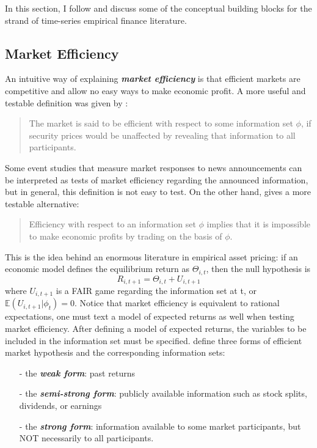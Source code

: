 In this section, I follow \citet[Chapter~5]{campbell2017financial} and discuss some 
of the conceptual building blocks for the strand of time-series empirical finance literature.

\subsection{Market Efficiency}\label{chap1:sec1:ssec1}
An intuitive way of explaining \textbf{\textit{market efficiency}} is that efficient markets
are competitive and allow no easy ways to make economic profit. A more useful and testable
definition was given by \citet[p.~127]{malkiel1989efficient}:

\begin{quote}
    The market is said to be efficient with respect to some information set $\phi$,
    if security prices would be unaffected by revealing that information to all participants.
\end{quote}

Some event studies that measure market responses to news announcements can be interpreted
as tests of market efficiency regarding the announced information, but in general, this 
definition is not easy to test. On the other hand, \cite{malkiel1989efficient} gives a more testable alternative:
\begin{quote}
    Efficiency with respect to an information set $\phi$ implies that it is impossible to
    make economic profits by trading on the basis of $\phi$.
\end{quote}

This is the idea behind an enormous literature in empirical asset pricing: if an economic model
defines the equilibrium return as $\Theta_{i,t}$, then the null hypothesis is
\begin{equation}
    R_{i,t+1} = \Theta_{i,t}+U_{i,t+1}
\end{equation}
where $U_{i,t+1}$ is a FAIR game regarding the information set at t, or $\mathbb{E}(U_{i,t+1}|\phi_t)=0$.
Notice that market efficiency is equivalent to rational expectations, one must text a model of
expected returns as well when testing market efficiency. After defining a model of expected returns,
the variables to be included in the information set must be specified. \citet{malkiel1970efficient} define
three forms of efficient market hypothesis and the corresponding information sets:
\begin{enumerate}
    \item[-] the \textbf{\textit{weak form}}: past returns
    \item[-] the \textbf{\textit{semi-strong form}}: publicly available information such as stock splits, dividends, or earnings
    \item[-]  the \textbf{\textit{strong form}}: information available to some market participants, but NOT necessarily to all participants.
\end{enumerate}

